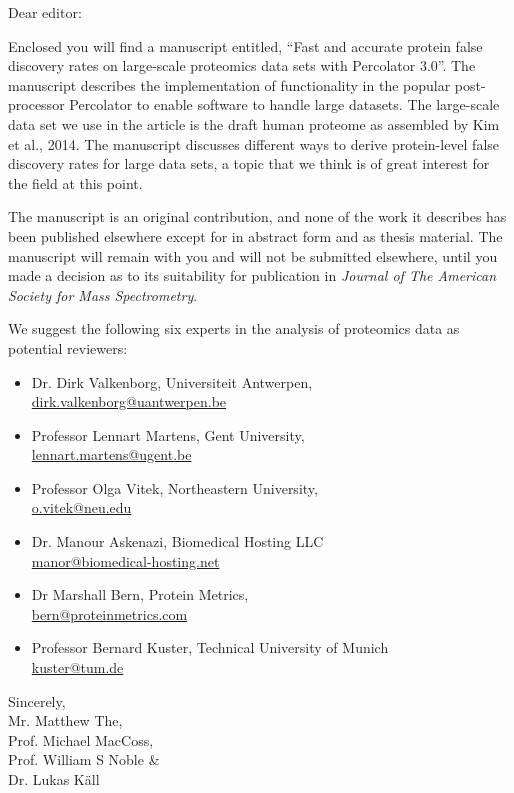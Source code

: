 \documentclass[a4paper]{letter}
\begin{document}
\begin{letter}{}
\vspace*{-5.0cm}

\opening{Dear editor:}

Enclosed you will find a manuscript entitled, ``Fast and accurate
protein false discovery rates on large-scale proteomics data sets with
Percolator 3.0''. The manuscript describes the implementation of
functionality in the popular post-processor Percolator to enable
software to handle large datasets. The large-scale data set we use in
the article is the draft human proteome as assembled by Kim et al.,
2014. The manuscript discusses different ways to derive protein-level
false discovery rates for large data sets, a topic that we think is of
great interest for the field at this point.

The manuscript is an original contribution, and none of the work it
describes has been published elsewhere except for in abstract form and
as thesis material. The manuscript will remain with you and will not
be submitted elsewhere, until you made a decision as to its
suitability for publication in {\em Journal of The American Society
  for Mass Spectrometry}.

We suggest the following six experts in the analysis of proteomics
data as potential reviewers:

\begin{itemize}

\item Dr. Dirk Valkenborg, Universiteit Antwerpen,\\
\url{dirk.valkenborg@uantwerpen.be}

\item Professor Lennart Martens,
Gent University, \\
\url{lennart.martens@ugent.be}

\item Professor Olga Vitek,
      Northeastern University, \\
\url{o.vitek@neu.edu}

\item Dr. Manour Askenazi, Biomedical Hosting LLC\\
\url{manor@biomedical-hosting.net}

\item Dr Marshall Bern, Protein Metrics, \\
\url{bern@proteinmetrics.com}

\item Professor Bernard Kuster, Technical University of Munich\\
\url{kuster@tum.de}

\end{itemize}

\vspace*{1.5em}

Sincerely,\\[2em]
Mr. Matthew The,\\
Prof. Michael MacCoss,\\
Prof. William S Noble \& \\
Dr. Lukas K\"all

\end{letter}
\end{document}
